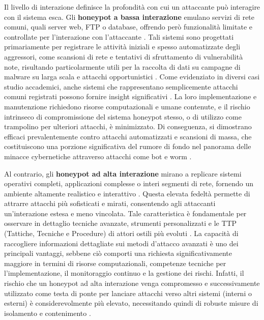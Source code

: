 Il livello di interazione definisce la profondità con cui un attaccante può interagire con il sistema esca. Gli \textbf{honeypot a bassa interazione} emulano servizi di rete comuni, quali server web, FTP o database, offrendo però funzionalità limitate e controllate per l'interazione con l'attaccante \cite{vito2024}. Tali sistemi sono progettati primariamente per registrare le attività iniziali e spesso automatizzate degli aggressori, come scansioni di rete e tentativi di sfruttamento di vulnerabilità note, risultando particolarmente utili per la raccolta di dati su campagne di malware su larga scala e attacchi opportunistici \cite{fortinet2023}. Come evidenziato in diversi casi studio accademici, anche sistemi che rappresentano semplicemente attacchi comuni registrati possono fornire insight significativi \cite{gadapa_sai_devineni_reddy_bommu_busi}. La loro implementazione e manutenzione richiedono risorse computazionali e umane contenute, e il rischio intrinseco di compromissione del sistema honeypot stesso, o di utilizzo come trampolino per ulteriori attacchi, è minimizzato. Di conseguenza, si dimostrano efficaci prevalentemente contro attacchi automatizzati e scansioni di massa, che costituiscono una porzione significativa del rumore di fondo nel panorama delle minacce cybernetiche attraverso attacchi come bot e worm \cite{nordvpn}.



Al contrario, gli \textbf{honeypot ad alta interazione} mirano a replicare sistemi operativi completi, applicazioni complesse o interi segmenti di rete, fornendo un ambiente altamente realistico e interattivo \cite{vito2024}. Questa elevata fedeltà permette di attrarre attacchi più sofisticati e mirati, consentendo agli attaccanti un'interazione estesa e meno vincolata. Tale caratteristica è fondamentale per osservare in dettaglio tecniche avanzate, strumenti personalizzati e le TTP (Tattiche, Tecniche e Procedure) di attori ostili più evoluti \cite{tsang_2022}. La capacità di raccogliere informazioni dettagliate sui metodi d'attacco avanzati è uno dei principali vantaggi, sebbene ciò comporti una richiesta significativamente maggiore in termini di risorse computazionali, competenze tecniche per l'implementazione, il monitoraggio continuo e la gestione dei rischi. Infatti, il rischio che un honeypot ad alta interazione venga compromesso e successivamente utilizzato come testa di ponte per lanciare attacchi verso altri sistemi (interni o esterni) è considerevolmente più elevato, necessitando quindi di robuste misure di isolamento e contenimento \cite{gadapa_sai_devineni_reddy_bommu_busi}.




